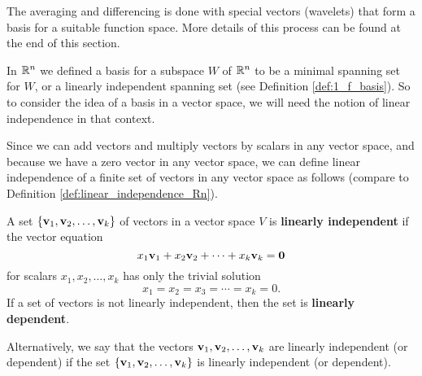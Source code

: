 The averaging and differencing is done with special vectors (wavelets) that form a basis for a suitable function space. More details of this process can be found at the end of this section. 



In $\mathbb{R}^n$ we defined a basis for a subspace $W$ of $\mathbb{R}^n$ to be a minimal spanning set for $W$, or a linearly independent spanning set (see Definition \ref{def:1_f_basis}). So to consider the idea of a basis in a vector space, we will need the notion of linear independence in that context. 

Since we can add vectors and multiply vectors by scalars in any vector space, and because we have a zero vector in any vector space, we can define linear independence of a finite set of vectors in any vector space as follows (compare to Definition \ref{def:linear_independence_Rn}). 


\begin{definition} \label{def:vs_linear_independence} A set $\{\mathbf{v}_1, \mathbf{v}_2, \ldots, \mathbf{v}_k\}$ of vectors in a vector space $V$ is \textbf{linearly independent} if the vector equation
\[x_1 \mathbf{v}_1 + x_2 \mathbf{v}_2 + \cdots + x_k \mathbf{v}_k = \mathbf{0}\]
for scalars $x_1, x_2, \ldots, x_k$ has only the trivial solution
\[x_1 = x_2 = x_3 = \cdots = x_k = 0.\]
If a set of vectors is not linearly independent, then the set is \textbf{linearly dependent}.
\end{definition}

Alternatively, we say that the vectors $\mathbf{v}_1, \mathbf{v}_2, \ldots, \mathbf{v}_k$ are linearly independent (or dependent) if the set $\{\mathbf{v}_1, \mathbf{v}_2, \ldots, \mathbf{v}_k\}$ is linearly independent (or dependent).



